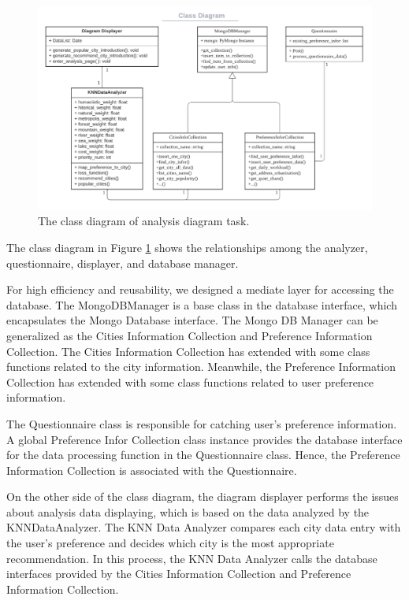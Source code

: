 \documentclass[conference]{IEEEtran}
\begin{document}
\begin{figure}[htbp]
\centerline{\includegraphics[width=1.0\textwidth]{diagram_structual_context.pdf}}
\caption{The class diagram of analysis diagram task.}
\label{fig_diagram_class}
\end{figure}

The class diagram in Figure \ref{fig_diagram_class} shows the relationships among the analyzer, questionnaire, displayer, and database manager. 

For high efficiency and reusability, we designed a mediate layer for accessing the database. The MongoDBManager is a base class in the database interface, which encapsulates the Mongo Database interface. The Mongo DB Manager can be generalized as the Cities Information Collection and Preference Information Collection. The Cities Information Collection has extended with some class functions related to the city information. Meanwhile, the Preference Information Collection has extended with some class functions related to user preference information.

The Questionnaire class is responsible for catching user's preference information. A global Preference Infor Collection class instance provides the database interface for the data processing function in the Questionnaire class. Hence, the Preference Information Collection is associated with the Questionnaire.

On the other side of the class diagram, the diagram displayer performs the issues about analysis data displaying, which is based on the data analyzed by the KNNDataAnalyzer. The KNN Data Analyzer compares each city data entry with the user's preference and decides which city is the most appropriate recommendation. In this process, the KNN Data Analyzer calls the database interfaces provided by the Cities Information Collection and Preference Information Collection.
\end{document}
